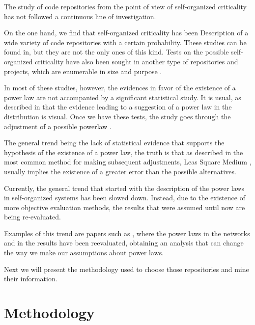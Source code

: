 \documentclass[conference]{IEEEtran}
\begin{document}
The study of code repositories from the point of view of self-organized criticality has not followed a continuous line of investigation.

On the one hand, we find that self-organized criticality has been
Description of a wide variety of code repositories with a certain probability. These studies can be found in\cite{wu2007empirical,gorshenev2004punctuated}, but they are not the only ones of this kind. Tests on the possible self-organized criticality have also been sought in another type of repositories and projects, which are enumerable in size and purpose \cite{Merelo2016:repomining,merelo16:slash,merelo16:self,merelo2017self}.

In most of these studies, however, the evidences in favor of the existence of a power law are not accompanied by a significant statistical study. It is usual, as described in \cite{newman2005power} that the evidence leading to a suggestion of a power law in the distribution is visual. Once we have these tests, the study goes through the adjustment of a possible powerlaw \cite{merelo2017self,arafat2009commit}.

The general trend being the lack of statistical evidence that supports the hypothesis of the existence of a power law, the truth is that as described in \cite{newman2005power, clauset2009power} the most common method for making subsequent adjustments, Leas Square Medium \cite{merelo2017self,arafat2009commit,merelo16:self}, usually implies the existence of a greater error than the possible alternatives.

Currently, the general trend that started with the description of the power laws in self-organized systems has been slowed down. Instead, due to the existence of more objective evaluation methods, the results that were assumed until now are being re-evaluated.

Examples of this trend are papers such as \cite{Holme2019, Broido2019}, where the power laws in the networks and in the results have been reevaluated, obtaining an analysis that can change the way we make our assumptions about power laws.

Next we will present the methodology used to choose those repositories and
mine their information. 




\section{Methodology}
\label{sec:method}
\end{document}

